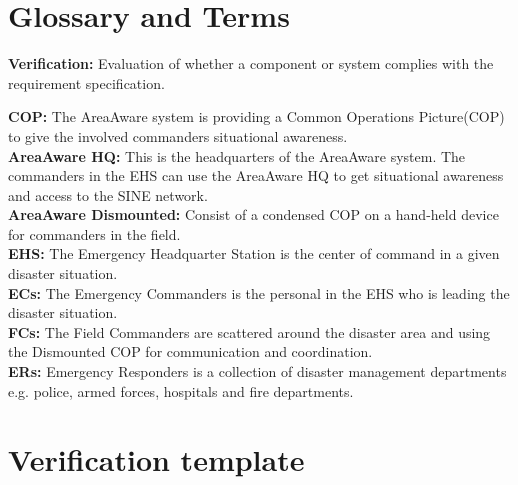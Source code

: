 \appendix
\label{chp_appendix}
\chapter{Glossary and Terms}


\textbf{Verification:} Evaluation of whether a component or system complies with the requirement specification.

\textbf{COP:} The AreaAware system is providing a Common Operations Picture(COP) to give the involved commanders situational awareness.\\

\noindent \textbf{AreaAware HQ:} This is the headquarters of the AreaAware system. The commanders in the EHS can use the AreaAware HQ to get situational awareness and access to the SINE network.\\

\noindent \textbf{AreaAware Dismounted:} Consist of a condensed COP on a hand-held device for commanders in the field.\\

\noindent \textbf{EHS:} The Emergency Headquarter Station is the center of command in a given disaster situation.\\

\noindent \textbf{ECs:} The Emergency Commanders is the personal in the EHS who is leading the disaster situation.\\

\noindent \textbf{FCs:} The Field Commanders are scattered around the disaster area and using the Dismounted COP for communication and coordination.\\

\noindent \textbf{ERs:} Emergency Responders is a collection of disaster management departments e.g. police, armed forces, hospitals and fire departments.\\





\label{chp_appendixTemplate}
\chapter{Verification template}



